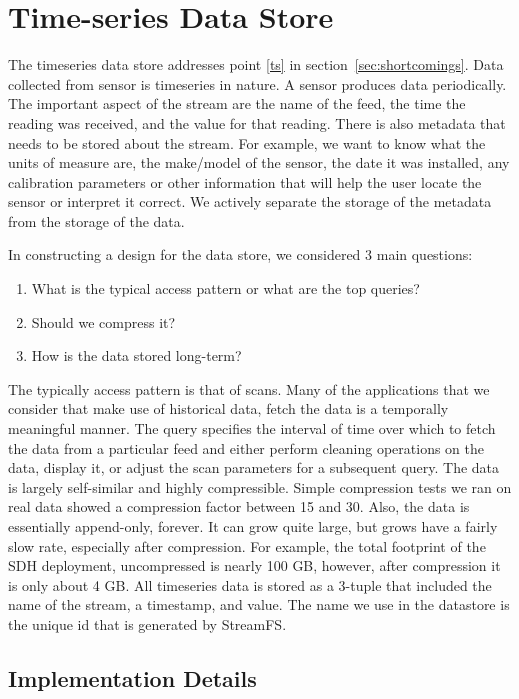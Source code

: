 \section{Time-series Data Store}

The timeseries data store addresses point \ref{ts} in section~\ref{sec:shortcomings}.
Data collected from sensor is timeseries in nature.  A sensor produces data periodically.  The important aspect of
the stream are the name of the feed, the time the reading was received, and the value for that reading.  There is also
metadata that needs to be stored about the stream.  For example, we want to know what the units of measure are, 
the make/model of the sensor, the date it was installed, any calibration parameters or other information that will help 
the user locate the sensor or interpret it correct.  We actively separate the storage of the metadata from the storage 
of the data.

In constructing a design for the data store, we considered 3 main questions:

\begin{enumerate}
\item What is the typical access pattern or what are the top queries?
\item Should we compress it?
\item How is the data stored long-term?
\end{enumerate}

The typically access pattern is that of scans.  Many of the applications that we consider that make use of historical data, fetch the data
is a temporally meaningful manner.  The query specifies the interval of time over which to fetch the data from a particular feed
and either perform cleaning operations on the data, display it, or adjust the scan parameters for a subsequent query.
The data is largely self-similar and highly compressible.  Simple compression tests we ran on real data showed a compression factor 
between 15 and 30.  Also, the data is essentially append-only, forever.  It can grow quite large, but grows have a fairly 
slow rate, especially after compression.  For example, the total footprint of the SDH deployment, uncompressed 
is nearly 100 GB, however, after compression it is only about 4 GB.
All timeseries data is stored as a 3-tuple that included the name of the stream, a timestamp, and value.  The name we use in
the datastore is the unique id that is generated by StreamFS.  %

\subsection{Implementation Details}

